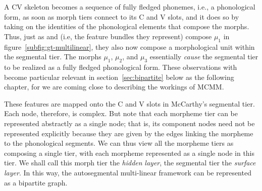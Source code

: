 A CV skeleton becomes a sequence of fully fledged phonemes, i.e., a phonological
form, as soon as morph tiers connect to its C and V slots, and it does so by taking 
on the identities of the phonological elements that compose the morphs. 
Thus, just as  and  (i.e, the feature bundles they represent) compose 
$\mu_1$ in figure~\ref{subfig:gt-multilinear}, they also now compose a morphological 
unit within the segmental tier. The morphs $\mu_1$, $\mu_2$, and $\mu_3$ 
essentially \emph{cause} the segmental tier to be realized as a fully fledged 
phonological form. These observations with become particular relevant in section~\ref{sec:bipartite} 
below as the following chapter, for we are coming close to describing the workings 
of \ac{MCMM}. 


These features are mapped onto the
C and V slots in McCarthy's segmental tier. 
 Each node, therefore, is complex.
But note that each morpheme tier can be represented abstractly as a single node; that is, 
its component nodes need not be represented explicitly 
because they are given by the edges linking the morpheme to the phonological segments.
We can thus view all the morpheme tiers as composing a single tier, with each morpheme represented as a single node in this tier.
We shall call this morph tier the \emph{hidden} \emph{layer}, the segmental tier the \emph{surface} \emph{layer}. 
In this way, the autosegmental multi-linear framework can be represented as a bipartite graph.

